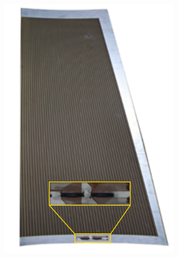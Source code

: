 	\begin{figure}[H]
		\begin{subfigure}{0.4\linewidth}
		    \centering
			\includegraphics[width = \linewidth]{fig/chapt6/iRPC-RPCROC-PCB.png}
			\caption{\label{fig:RPCROC_FEB:A}}
		\end{subfigure}
		\begin{subfigure}{0.6\linewidth}
		    \centering

\end{subfigure}
\end{figure}
